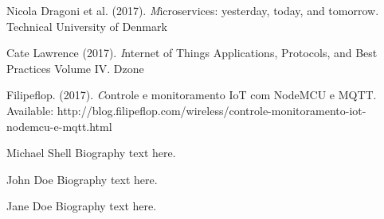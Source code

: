 \documentclass[journal]{IEEEtran}
\begin{document}
\begin{thebibliography}{1}
Nicola Dragoni et al. (2017). \emph Microservices: yesterday, today, and tomorrow. Technical University of Denmark

Cate Lawrence (2017). \emph Internet of Things Applications, Protocols, and Best Practices Volume IV. Dzone

Filipeflop. (2017). \emph Controle e monitoramento IoT com NodeMCU e MQTT. Available: http://blog.filipeflop.com/wireless/controle-monitoramento-iot-nodemcu-e-mqtt.html 

\end{thebibliography}

% 

\begin{IEEEbiography}{Michael Shell}
Biography text here.
\end{IEEEbiography}

\begin{IEEEbiographynophoto}{John Doe}
Biography text here.
\end{IEEEbiographynophoto}


\begin{IEEEbiographynophoto}{Jane Doe}
Biography text here.
\end{IEEEbiographynophoto}






\end{document}
